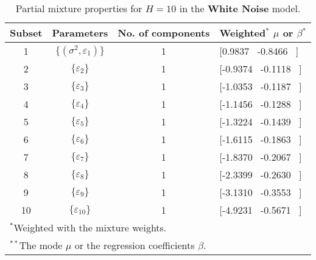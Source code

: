 \footnotesize{  
{ \renewcommand{\arraystretch}{1.3} 
\begin{longtable}{cccp{3.6cm}} 
\caption{Partial mixture properties for $H=10$ in the \textbf{White Noise} model.} 
\label{tab:pmits_WN} \\ 
 Subset & Parameters & No. of components  & Weighted$^{*}$ $\mu$ or $\beta$$^{*}$ \\ \hline 
1 & $\{(\sigma^{2},\varepsilon_{1})\}$ & 1 & [0.9837 \, -0.8466 \, ]   \\ [1ex] 
2 & $\{\varepsilon_{2}\}$ & 1 & [-0.9374 \, -0.1118 \, ]   \\ [1ex] 
3 & $\{\varepsilon_{3}\}$ & 1 & [-1.0353 \, -0.1187 \, ]   \\ [1ex] 
4 & $\{\varepsilon_{4}\}$ & 1 & [-1.1456 \, -0.1288 \, ]   \\ [1ex] 
5 & $\{\varepsilon_{5}\}$ & 1 & [-1.3224 \, -0.1439 \, ]   \\ [1ex] 
6 & $\{\varepsilon_{6}\}$ & 1 & [-1.6115 \, -0.1863 \, ]   \\ [1ex] 
7 & $\{\varepsilon_{7}\}$ & 1 & [-1.8370 \, -0.2067 \, ]   \\ [1ex] 
8 & $\{\varepsilon_{8}\}$ & 1 & [-2.3399 \, -0.2630 \, ]   \\ [1ex] 
9 & $\{\varepsilon_{9}\}$ & 1 & [-3.1310 \, -0.3553 \, ]   \\ [1ex] 
10 & $\{\varepsilon_{10}\}$ & 1 & [-4.9231 \, -0.5671 \, ]   \\ [1ex] 
\hline 
 \multicolumn{4}{l}{\footnotesize{$^{*}$Weighted with the mixture weights.}} \\ 
 \multicolumn{4}{l}{\footnotesize{$^{**}$The mode $\mu$ or the regression coefficients $\beta$.}} \\ 
\end{longtable} 
} 
} 
